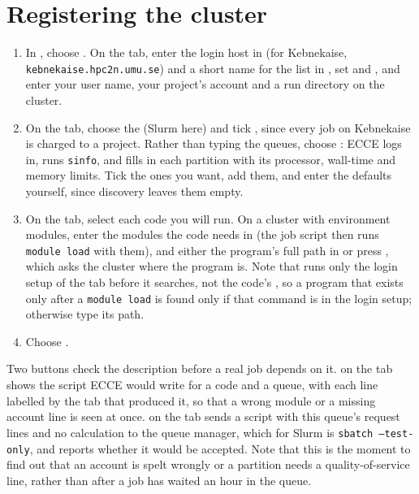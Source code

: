 \section{Registering the cluster}
\begin{enumerate}
	\item In , choose . On the  tab, enter the login host in  (for Kebnekaise, \texttt{kebnekaise.hpc2n.umu.se}) and a short name for the list in , set  and , and enter your user name, your project's account and a run directory on the cluster.
	\item On the  tab, choose the  (Slurm here) and tick , since every job on Kebnekaise is charged to a project. Rather than typing the queues, choose : ECCE logs in, runs \texttt{sinfo}, and fills in each partition with its processor, wall-time and memory limits. Tick the ones you want, add them, and enter the defaults yourself, since discovery leaves them empty.
	\item On the  tab, select each code you will run. On a cluster with environment modules, enter the modules the code needs in  (the job script then runs \texttt{module load} with them), and either the program's full path in  or press , which asks the cluster where the program is. Note that  runs only the login setup of the  tab before it searches, not the code's , so a program that exists only after a \texttt{module load} is found only if that command is in the login setup; otherwise type its path.
	\item Choose .
\end{enumerate}

Two buttons check the description before a real job depends on it.  on the  tab shows the script ECCE would write for a code and a queue, with each line labelled by the tab that produced it, so that a wrong module or a missing account line is seen at once.  on the  tab sends a script with this queue's request lines and no calculation to the queue manager, which for Slurm is \texttt{sbatch --test-only}, and reports whether it would be accepted. Note that this is the moment to find out that an account is spelt wrongly or a partition needs a quality-of-service line, rather than after a job has waited an hour in the queue.

